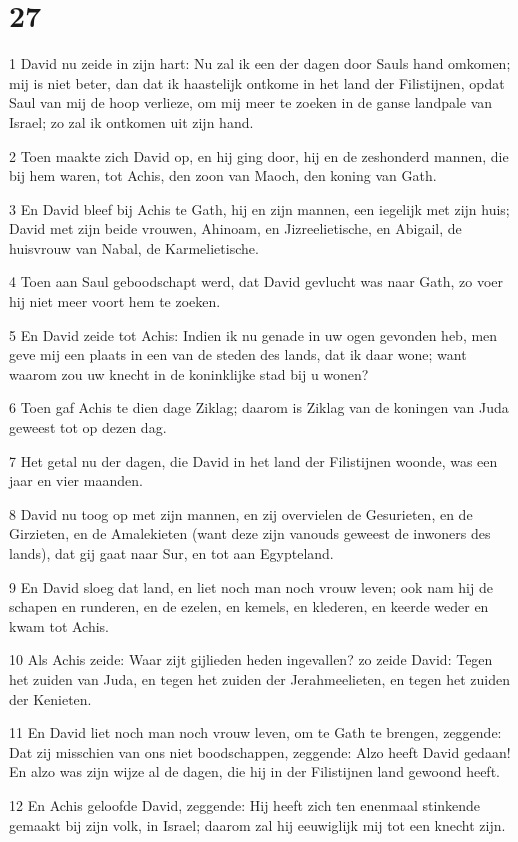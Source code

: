 \chapter{27}

\par 1 David nu zeide in zijn hart: Nu zal ik een der dagen door Sauls hand omkomen; mij is niet beter, dan dat ik haastelijk ontkome in het land der Filistijnen, opdat Saul van mij de hoop verlieze, om mij meer te zoeken in de ganse landpale van Israel; zo zal ik ontkomen uit zijn hand.
\par 2 Toen maakte zich David op, en hij ging door, hij en de zeshonderd mannen, die bij hem waren, tot Achis, den zoon van Maoch, den koning van Gath.
\par 3 En David bleef bij Achis te Gath, hij en zijn mannen, een iegelijk met zijn huis; David met zijn beide vrouwen, Ahinoam, en Jizreelietische, en Abigail, de huisvrouw van Nabal, de Karmelietische.
\par 4 Toen aan Saul geboodschapt werd, dat David gevlucht was naar Gath, zo voer hij niet meer voort hem te zoeken.
\par 5 En David zeide tot Achis: Indien ik nu genade in uw ogen gevonden heb, men geve mij een plaats in een van de steden des lands, dat ik daar wone; want waarom zou uw knecht in de koninklijke stad bij u wonen?
\par 6 Toen gaf Achis te dien dage Ziklag; daarom is Ziklag van de koningen van Juda geweest tot op dezen dag.
\par 7 Het getal nu der dagen, die David in het land der Filistijnen woonde, was een jaar en vier maanden.
\par 8 David nu toog op met zijn mannen, en zij overvielen de Gesurieten, en de Girzieten, en de Amalekieten (want deze zijn vanouds geweest de inwoners des lands), dat gij gaat naar Sur, en tot aan Egypteland.
\par 9 En David sloeg dat land, en liet noch man noch vrouw leven; ook nam hij de schapen en runderen, en de ezelen, en kemels, en klederen, en keerde weder en kwam tot Achis.
\par 10 Als Achis zeide: Waar zijt gijlieden heden ingevallen? zo zeide David: Tegen het zuiden van Juda, en tegen het zuiden der Jerahmeelieten, en tegen het zuiden der Kenieten.
\par 11 En David liet noch man noch vrouw leven, om te Gath te brengen, zeggende: Dat zij misschien van ons niet boodschappen, zeggende: Alzo heeft David gedaan! En alzo was zijn wijze al de dagen, die hij in der Filistijnen land gewoond heeft.
\par 12 En Achis geloofde David, zeggende: Hij heeft zich ten enenmaal stinkende gemaakt bij zijn volk, in Israel; daarom zal hij eeuwiglijk mij tot een knecht zijn.

